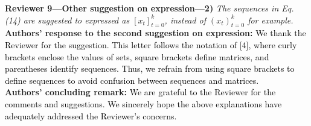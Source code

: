 \textbf{Reviewer 9—Other suggestion on expression—2)}\textit{ %
The sequences in Eq. (14) are suggested to expressed as $[x_t]^k_{t=0}$, instead of $(x_t)^k_{t=0}$ for example.}\\[2mm]
\textbf{Authors' response to the second suggestion on expression:} \textcolor{black}{We thank the Reviewer for the suggestion. This letter follows the notation of [4], %
where curly brackets enclose the values of sets, square brackets define matrices, and parentheses identify sequences. Thus, we refrain from using square brackets to define sequences to avoid confusion between sequences and matrices.}\\[4mm]
\textbf{Authors' concluding remark:} \textcolor{black}{We are grateful to the Reviewer for the comments and suggestions. We sincerely hope the above explanations have adequately addressed the Reviewer's concerns.}
